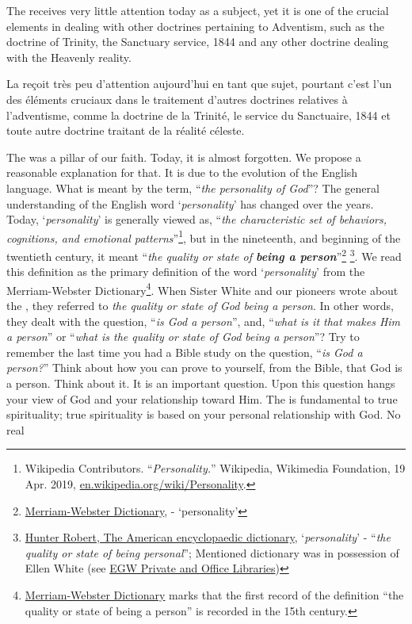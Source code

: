 The  receives very little attention today as a subject, yet it is one of the crucial elements in dealing with other doctrines pertaining to Adventism, such as the doctrine of Trinity, the Sanctuary service, 1844 and any other doctrine dealing with the Heavenly reality.


La  reçoit très peu d'attention aujourd'hui en tant que sujet, pourtant c'est l'un des éléments cruciaux dans le traitement d'autres doctrines relatives à l'adventisme, comme la doctrine de la Trinité, le service du Sanctuaire, 1844 et toute autre doctrine traitant de la réalité céleste.


The  was a pillar of our faith. Today, it is almost forgotten. We propose a reasonable explanation for that. It is due to the evolution of the English language. What is meant by the term, “\textit{the personality of God}”? The general understanding of the English word ‘\textit{personality}’ has changed over the years. Today, ‘\textit{personality}’ is generally viewed as, “\textit{the characteristic set of behaviors, cognitions, and emotional patterns}”\footnote{Wikipedia Contributors. “\textit{Personality.}” Wikipedia, Wikimedia Foundation, 19 Apr. 2019, \href{https://en.wikipedia.org/wiki/Personality}{en.wikipedia.org/wiki/Personality}.}, but in the nineteenth, and beginning of the twentieth century, it meant “\textit{the quality or state of \textbf{being a person}}”\footnote{\href{https://www.merriam-webster.com/dictionary/personality}{Merriam-Webster Dictionary}, - ‘personality’} \footnote{\href{https://babel.hathitrust.org/cgi/pt?id=mdp.39015050663213&view=1up&seq=780}{Hunter Robert, The American encyclopaedic dictionary}, ‘\textit{personality}’ - “\textit{the quality or state of being personal}”; Mentioned dictionary was in possession of Ellen White (see \href{https://repo.adventistdigitallibrary.org/PDFs/adl-22/adl-22251050.pdf?_ga=2.116010630.1065317374.1621993520-1506151612.1617862694&fbclid=IwAR3vwmp8jxtnpPEKv0KD9mCv8dJpmRGoyIXW0CkbQAjbU0h6YaBGqhgBzbk}{EGW Private and Office Libraries})}. We read this definition as the primary definition of the word ‘\textit{personality}’ from the Merriam-Webster Dictionary\footnote{\href{https://www.merriam-webster.com/dictionary/personality\#word-history}{Merriam-Webster Dictionary} marks that the first record of the definition “the quality or state of being a person” is recorded in the 15th century.}. When Sister White and our pioneers wrote about the , they referred to \textit{the quality or state of God being a person}. In other words, they dealt with the question, “\textit{is God a person}”, and, “\textit{what is it that makes Him a person}” or “\textit{what is the quality or state of God being a person}”? Try to remember the last time you had a Bible study on the question, “\textit{is God a person?}” Think about how you can prove to yourself, from the Bible, that God is a person. Think about it. It is an important question. Upon this question hangs your view of God and your relationship toward Him. The  is fundamental to true spirituality; true spirituality is based on your personal relationship with God. No real 